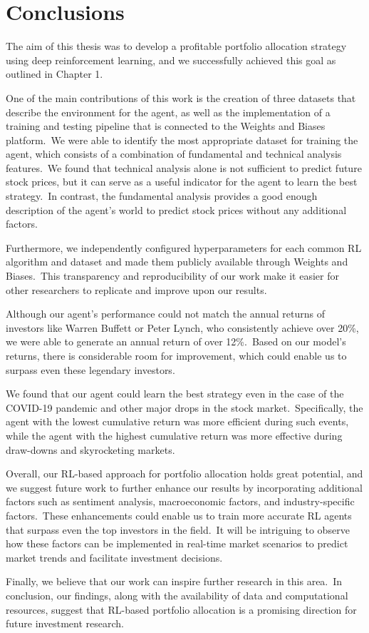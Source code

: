 \documentclass[../xlapes02]{subfiles}
\begin{document}
    \chapter{Conclusions}\label{ch:conclusions}
    The aim of this thesis was to develop a profitable portfolio allocation strategy using deep reinforcement learning, and we successfully achieved this goal as outlined in Chapter 1.

    One of the main contributions of this work is the creation of three datasets that describe the environment for the agent, as well as the implementation of a training and testing pipeline that is connected to the Weights and Biases platform.\ We were able to identify the most appropriate dataset for training the agent, which consists of a combination of fundamental and technical analysis features.\ We found that technical analysis alone is not sufficient to predict future stock prices, but it can serve as a useful indicator for the agent to learn the best strategy.\ In contrast, the fundamental analysis provides a good enough description of the agent's world to predict stock prices without any additional factors.

    Furthermore, we independently configured hyperparameters for each common RL algorithm and dataset and made them publicly available through Weights and Biases.\ This transparency and reproducibility of our work make it easier for other researchers to replicate and improve upon our results.

    Although our agent's performance could not match the annual returns of investors like Warren Buffett or Peter Lynch, who consistently achieve over 20\%, we were able to generate an annual return of over 12\%.\ Based on our model's returns, there is considerable room for improvement, which could enable us to surpass even these legendary investors.

    We found that our agent could learn the best strategy even in the case of the COVID-19 pandemic and other major drops in the stock market.\ Specifically, the agent with the lowest cumulative return was more efficient during such events, while the agent with the highest cumulative return was more effective during draw-downs and skyrocketing markets.

    Overall, our RL-based approach for portfolio allocation holds great potential, and we suggest future work to further enhance our results by incorporating additional factors such as sentiment analysis, macroeconomic factors, and industry-specific factors.\ These enhancements could enable us to train more accurate RL agents that surpass even the top investors in the field.\ It will be intriguing to observe how these factors can be implemented in real-time market scenarios to predict market trends and facilitate investment decisions.

    Finally, we believe that our work can inspire further research in this area.\ In conclusion, our findings, along with the availability of data and computational resources, suggest that RL-based portfolio allocation is a promising direction for future investment research.
\end{document}
